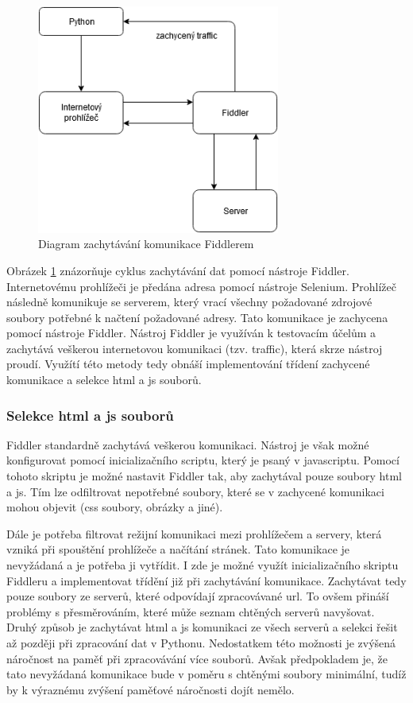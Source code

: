 \documentclass[thesis=M,czech,hidelinks]{FITthesis}[2013/05/06]
\begin{document}
\begin{figure}[h]
	\centering
	\includegraphics[width=8cm]{pictures/fiddler_diagram.png}
	\caption{Diagram zachytávání komunikace Fiddlerem}
	\label{fig:fiddler}
\end{figure}

Obrázek \ref{fig:fiddler} znázorňuje cyklus zachytávání dat pomocí nástroje Fiddler. Internetovému prohlížeči je předána adresa pomocí nástroje Selenium. Prohlížeč následně komunikuje se serverem, který vrací všechny požadované zdrojové soubory potřebné k načtení požadované adresy. Tato komunikace je zachycena pomocí nástroje Fiddler. Nástroj Fiddler je využíván k testovacím účelům a zachytává veškerou internetovou komunikaci (tzv. traffic), která skrze nástroj proudí. Využítí této metody tedy obnáší implementování třídení zachycené komunikace a selekce html a js souborů.

\subsubsection{Selekce html a js souborů}
Fiddler standardně zachytává veškerou komunikaci. Nástroj je však možné konfigurovat pomocí inicializačního scriptu, který je psaný v javascriptu. Pomocí tohoto skriptu je možné nastavit Fiddler tak, aby zachytával pouze soubory html a js. Tím lze odfiltrovat nepotřebné soubory, které se v zachycené komunikaci mohou objevit (css soubory, obrázky a jiné).

Dále je potřeba filtrovat režijní komunikaci mezi prohlížečem a servery, která vzniká při spouštění prohlížeče a načítání stránek. Tato komunikace je nevyžádaná a je potřeba ji vytřídit. I zde je možné využít inicializačního skriptu Fiddleru a implementovat třídění již při zachytávání komunikace. Zachytávat tedy pouze soubory ze serverů, které odpovídají zpracovávané url. To ovšem přináší problémy s přesměrováním, které může seznam chtěných serverů navyšovat. Druhý způsob je zachytávat html a js komunikaci ze všech serverů a selekci řešit až později při zpracování dat v Pythonu. Nedostatkem této možnosti je zvýšená náročnost na paměť při zpracovávání více souborů. Avšak předpokladem je, že tato nevyžádaná komunikace bude v poměru s chtěnými soubory minimální, tudíž by k výraznému zvýšení paměťové náročnosti dojít nemělo.
\end{document}
